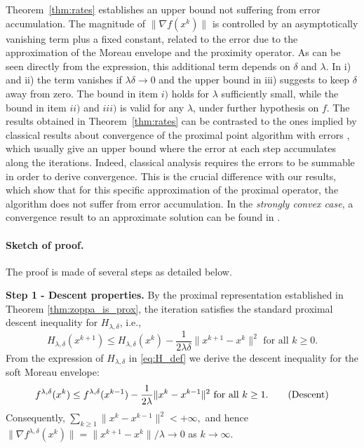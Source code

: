 \documentclass{article}
\begin{document}
   Theorem~\ref{thm:rates} establishes an upper bound not suffering from error accumulation. The magnitude of  $\|\nabla f(x^k)\|$ is controlled by an asymptotically vanishing term plus a fixed constant, related to the error due to the approximation of the Moreau envelope and the proximity operator. As can be seen directly from the expression, this additional term depends on  $\delta$ and $\lambda$. In i) and ii) the term vanishes if $\lambda\delta\to 0$ and the upper bound in iii) suggests to keep $\delta$ away from zero. The bound in item $i)$ holds for $\lambda$ sufficiently small, while the bound in item $ii)$ and $iii)$ is valid for any $\lambda$, under further hypothesis on $f$. The results obtained in Theorem~\ref{thm:rates} can be contrasted to the ones implied by classical results about convergence of the proximal  point algorithm with errors \cite{Salzo2012,schmidt2011convergence}, which usually give an upper bound where the error at each step accumulates along the iterations. Indeed, classical analysis requires the errors to be summable in order to derive convergence. This is the crucial difference with our results, which show that for this specific approximation of the proximal operator, the algorithm does not  suffer from error accumulation.  In the {\em strongly convex case}, a convergence result to an approximate solution can be found in \cite[Section 4]{lauga2026}.  

\paragraph{Sketch of proof.} The proof is made of several steps as detailed below. 

{\bf Step 1 - Descent properties.} By the proximal representation established in Theorem
\ref{thm:zoppa_is_prox}, the iteration satisfies the standard proximal descent inequality for $H_{\lambda,\delta}$, i.e.,
\[H_{\lambda,\delta}(x^{k+1})\le H_{\lambda,\delta}(x^{k}) - \frac{1}{2\lambda \delta}\|x^{k+1}-x^{k}\|^2 \text{ for all } k\ge 0. \] 
From the expression of $H_{\lambda,\delta}$ in \eqref{eq:H_def} we derive the descent inequality for the soft Moreau envelope:
\begin{equation}
    f^{\lambda,\delta}(x^{k})\le f^{\lambda,\delta}(x^{k-1}) - \frac{1}{2\lambda}\|x^{k}-x^{k-1}\|^2 \text{ for all } k\ge 1. \tag{\text{Descent}}
\end{equation}
Consequently, $\sum_{k\ge 1}\|x^k-x^{k-1}\|^2<+\infty,$
and hence $\|\nabla f^{\lambda,\delta}(x^k)\|=\|x^{k+1}-x^k\|/\lambda\to 0$ as $k\to \infty$.
\end{document}
